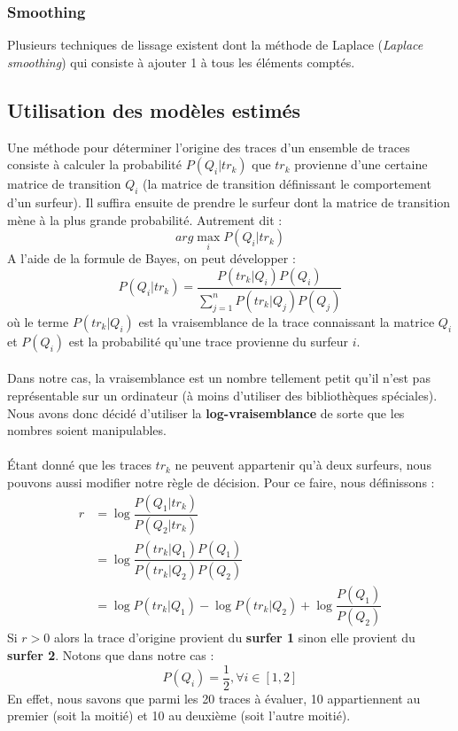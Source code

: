 \documentclass[a4paper,titlepage]{report}
\begin{document}
\subsubsection{Smoothing}
Plusieurs techniques de lissage existent dont la méthode de Laplace (\textit{Laplace smoothing}) qui consiste à ajouter 1 à tous les éléments comptés.

\subsection{Utilisation des modèles estimés}
\label{ssec:util_esti}
Une méthode pour déterminer l'origine des traces d'un ensemble de traces consiste à calculer la probabilité $P(Q_i|tr_k)$ que $tr_k$ provienne d'une certaine matrice de transition $Q_i$ (la matrice de transition définissant le comportement d'un surfeur). Il suffira ensuite de prendre le surfeur dont la matrice de transition mène à la plus grande probabilité. Autrement dit : 
\[
arg \max\limits_i P(Q_i|tr_k)
\]
A l'aide de la formule de Bayes, on peut développer : 
\[
P(Q_i|tr_k) = \dfrac{P(tr_k|Q_i) P(Q_i)}{\sum\limits_{j = 1}^n P(tr_k|Q_j) P(Q_j)}
\]
où le terme $P(tr_k|Q_i)$ est la vraisemblance de la trace connaissant la matrice $Q_i$ et $P(Q_i)$ est la probabilité qu'une trace provienne du surfeur $i$.
\paragraph{}
Dans notre cas, la vraisemblance est un nombre tellement petit qu'il n'est pas représentable sur un ordinateur (à moins d'utiliser des bibliothèques spéciales). Nous avons donc décidé d'utiliser la \textbf{log-vraisemblance} de sorte que les nombres soient manipulables. 
\paragraph{} 
Étant donné que les traces $tr_k$ ne peuvent appartenir qu'à deux surfeurs, nous pouvons aussi modifier notre règle de décision. Pour ce faire, nous définissons :
\[
\begin{aligned}
r &= \log \dfrac{P(Q_1|tr_k)}{P(Q_2|tr_k)}\\
&= \log \dfrac{P(tr_k|Q_1) P(Q_1)}{P(tr_k|Q_2) P(Q_2)}\\
&= \log P(tr_k|Q_1) - \log P(tr_k|Q_2) + \log \dfrac{P(Q_1)}{P(Q_2)}
\end{aligned}
\]
Si $r > 0$ alors la trace d'origine provient du \textbf{surfer 1} sinon elle provient du \textbf{surfer 2}. Notons que dans notre cas :
\[ 
	P(Q_i) = \frac{1}{2}, \forall i \in [1,2]
\]
En effet, nous savons que parmi les 20 traces à évaluer, 10 appartiennent au premier (soit la moitié) et 10 au deuxième (soit l'autre moitié).  
\end{document}
